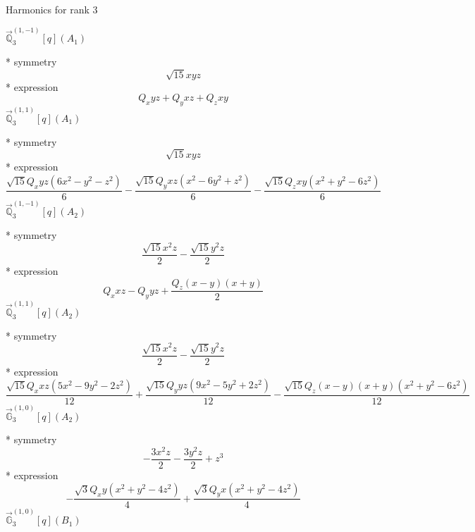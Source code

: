 \documentclass[fleqn,8pt]{jsarticle}
\begin{document}
\noindent * Harmonics for rank 3

\noindent\quad $\vec{\mathbb{Q}}_{3}^{(1,-1)}[q](A_{1})$

\noindent\quad ** symmetry
\begin{dmath*}
\sqrt{15} x y z
\end{dmath*}
\noindent\quad ** expression
\begin{dmath*}
Q_{x} y z + Q_{y} x z + Q_{z} x y
\end{dmath*}
\noindent\quad $\vec{\mathbb{Q}}_{3}^{(1,1)}[q](A_{1})$

\noindent\quad ** symmetry
\begin{dmath*}
\sqrt{15} x y z
\end{dmath*}
\noindent\quad ** expression
\begin{dmath*}
\frac{\sqrt{15} Q_{x} y z \left(6 x^{2} - y^{2} - z^{2}\right)}{6} - \frac{\sqrt{15} Q_{y} x z \left(x^{2} - 6 y^{2} + z^{2}\right)}{6} - \frac{\sqrt{15} Q_{z} x y \left(x^{2} + y^{2} - 6 z^{2}\right)}{6}
\end{dmath*}
\noindent\quad $\vec{\mathbb{Q}}_{3}^{(1,-1)}[q](A_{2})$

\noindent\quad ** symmetry
\begin{dmath*}
\frac{\sqrt{15} x^{2} z}{2} - \frac{\sqrt{15} y^{2} z}{2}
\end{dmath*}
\noindent\quad ** expression
\begin{dmath*}
Q_{x} x z - Q_{y} y z + \frac{Q_{z} \left(x - y\right) \left(x + y\right)}{2}
\end{dmath*}
\noindent\quad $\vec{\mathbb{Q}}_{3}^{(1,1)}[q](A_{2})$

\noindent\quad ** symmetry
\begin{dmath*}
\frac{\sqrt{15} x^{2} z}{2} - \frac{\sqrt{15} y^{2} z}{2}
\end{dmath*}
\noindent\quad ** expression
\begin{dmath*}
\frac{\sqrt{15} Q_{x} x z \left(5 x^{2} - 9 y^{2} - 2 z^{2}\right)}{12} + \frac{\sqrt{15} Q_{y} y z \left(9 x^{2} - 5 y^{2} + 2 z^{2}\right)}{12} - \frac{\sqrt{15} Q_{z} \left(x - y\right) \left(x + y\right) \left(x^{2} + y^{2} - 6 z^{2}\right)}{12}
\end{dmath*}
\noindent\quad $\vec{\mathbb{G}}_{3}^{(1,0)}[q](A_{2})$

\noindent\quad ** symmetry
\begin{dmath*}
- \frac{3 x^{2} z}{2} - \frac{3 y^{2} z}{2} + z^{3}
\end{dmath*}
\noindent\quad ** expression
\begin{dmath*}
- \frac{\sqrt{3} Q_{x} y \left(x^{2} + y^{2} - 4 z^{2}\right)}{4} + \frac{\sqrt{3} Q_{y} x \left(x^{2} + y^{2} - 4 z^{2}\right)}{4}
\end{dmath*}
\noindent\quad $\vec{\mathbb{G}}_{3}^{(1,0)}[q](B_{1})$
\end{document}
